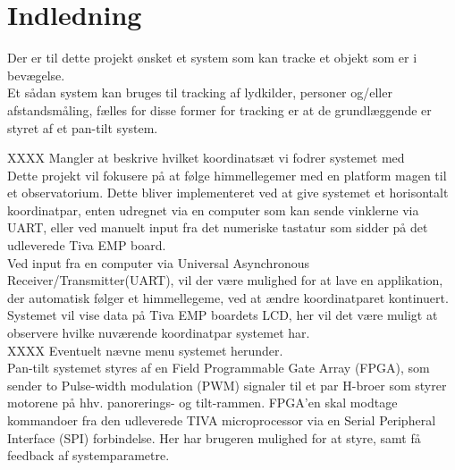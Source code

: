 \section{Indledning}
Der er til dette projekt ønsket et system som kan tracke et objekt som er i bevægelse.\\
Et sådan system kan bruges til tracking af lydkilder, personer og/eller afstandsmåling, fælles for disse former for tracking er at de grundlæggende er styret af et pan-tilt system.

XXXX Mangler at beskrive hvilket koordinatsæt vi fodrer systemet med\\
Dette projekt vil fokusere på at følge himmellegemer med en platform magen til et observatorium. Dette bliver implementeret ved at give systemet et horisontalt koordinatpar, enten udregnet via en computer som kan sende vinklerne via UART, eller ved manuelt input fra det numeriske tastatur som sidder på det udleverede Tiva EMP board.\\
Ved input fra en computer via Universal Asynchronous Receiver/Transmitter(UART), vil der være mulighed for at lave en applikation, der automatisk følger et himmellegeme, ved at ændre koordinatparet kontinuert.
Systemet vil vise data på Tiva EMP boardets LCD, her vil det være muligt at observere hvilke nuværende koordinatpar systemet har.\\
XXXX Eventuelt nævne menu systemet herunder.\\

Pan-tilt systemet styres af en Field Programmable Gate Array (FPGA), som sender to Pulse-width modulation (PWM) signaler til et par H-broer som styrer motorene på hhv. panorerings- og tilt-rammen.
FPGA’en skal modtage kommandoer fra den udleverede TIVA microprocessor via en Serial Peripheral Interface (SPI) forbindelse.
Her har brugeren mulighed for at styre, samt få feedback af systemparametre.